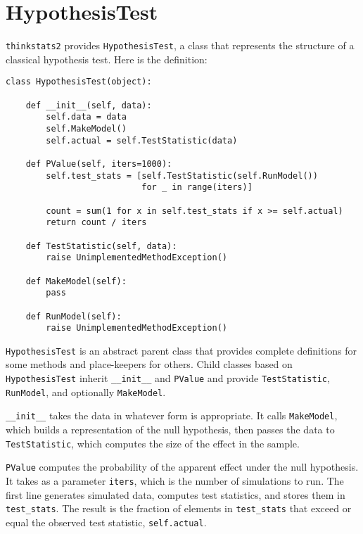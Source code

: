\documentclass[12pt]{book}
\begin{document}
\section{HypothesisTest}
\label{hypotest}

{\tt thinkstats2} provides {\tt HypothesisTest}, a
class that represents the structure of a classical hypothesis
test.  Here is the definition:

\begin{verbatim}
class HypothesisTest(object):

    def __init__(self, data):
        self.data = data
        self.MakeModel()
        self.actual = self.TestStatistic(data)

    def PValue(self, iters=1000):
        self.test_stats = [self.TestStatistic(self.RunModel()) 
                           for _ in range(iters)]

        count = sum(1 for x in self.test_stats if x >= self.actual)
        return count / iters

    def TestStatistic(self, data):
        raise UnimplementedMethodException()

    def MakeModel(self):
        pass

    def RunModel(self):
        raise UnimplementedMethodException()
\end{verbatim}

{\tt HypothesisTest} is an abstract parent class that provides
complete definitions for some methods and place-keepers for others.
Child classes based on {\tt HypothesisTest} inherit \verb"__init__"
and {\tt PValue} and provide {\tt TestStatistic},
{\tt RunModel}, and optionally {\tt MakeModel}.

\verb"__init__" takes the data in whatever form is appropriate.  It
calls {\tt MakeModel}, which builds a representation of the null
hypothesis, then passes the data to {\tt TestStatistic}, which
computes the size of the effect in the sample.

{\tt PValue} computes the probability of the apparent effect under
the null hypothesis.  It takes as a parameter {\tt iters}, which is
the number of simulations to run.  The first line generates simulated
data, computes test statistics, and stores them in
\verb"test_stats".
The result is
the fraction of elements in \verb"test_stats" that
exceed or equal the observed test statistic, {\tt self.actual}.
\end{document}
